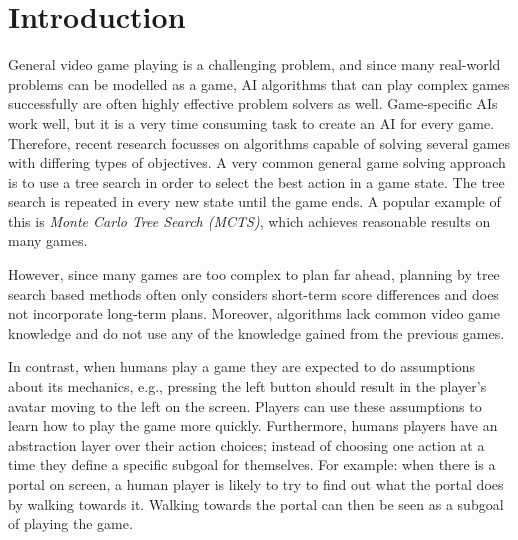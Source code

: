 \section{Introduction}
\label{sec:introduction}
%

General video game playing is a challenging problem, and since many real-world
problems can be modelled as a game, AI algorithms that can play
complex games successfully are often highly effective problem solvers as well.
Game-specific AIs work well, but it is a very time consuming task to create an
AI for every game.  Therefore, recent research focusses on algorithms capable of
solving several games with differing types of objectives.  A very common general
game solving approach is to use a tree search in order to select the best action
in a game state. The tree search is repeated in every new state until the game
ends. A popular example of this is \emph{Monte Carlo Tree Search (MCTS)}, which
achieves reasonable results on many games.

However, since many games are too complex to plan far ahead, planning by tree
search based methods often only considers short-term score differences and does
not incorporate long-term plans. Moreover, algorithms lack common video game
knowledge and do not use any of the knowledge gained from the previous games.

In contrast, when humans play a game they are expected to do assumptions about
its mechanics, e.g., pressing the left button should result in the player's
avatar moving to the left on the screen. Players can use these assumptions to
learn how to play the game more quickly. Furthermore, humans players have an
abstraction layer over their action choices; instead of choosing one action at a
time they define a specific subgoal for themselves.  For example: when there is
a portal on screen, a human player is likely to try to find out what the portal
does by walking towards it. Walking towards the portal can then be seen as a
subgoal of playing the game.


